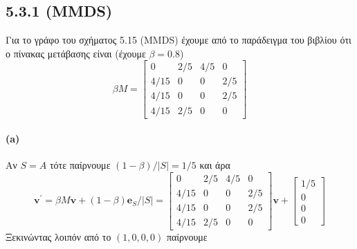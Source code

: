 \documentclass[a4paper,11pt]{article}
\begin{document}
\subsection*{5.3.1 (MMDS)}

Για το γράφο του σχήματος 5.15 (MMDS) έχουμε από το παράδειγμα του βιβλίου ότι ο πίνακας μετάβασης είναι (έχουμε $\beta=0.8$)
\[
	\beta M =
	\begin{bmatrix}
		0 & 2/5 & 4/5 & 0 \\
		4/15 & 0 & 0 & 2/5 \\
		4/15 & 0 & 0 & 2/5 \\
		4/15 & 2/5 & 0 & 0
	\end{bmatrix}
\]

\paragraph{(a)} Αν $S={A}$ τότε παίρνουμε $(1-\beta)/|S|=1/5$ και άρα
\[
	\textbf{v}^\prime = \beta M \textbf{v} + (1-\beta)\textbf{e}_S/|S| =
	\begin{bmatrix}
		0 & 2/5 & 4/5 & 0 \\
		4/15 & 0 & 0 & 2/5 \\
		4/15 & 0 & 0 & 2/5 \\
		4/15 & 2/5 & 0 & 0
	\end{bmatrix}
	\textbf{v} +
	\begin{bmatrix}
		1/5 \\ 0 \\ 0 \\ 0
	\end{bmatrix}
\]
Ξεκινώντας λοιπόν από το $(1,0,0,0)$ παίρνουμε
\end{document}

